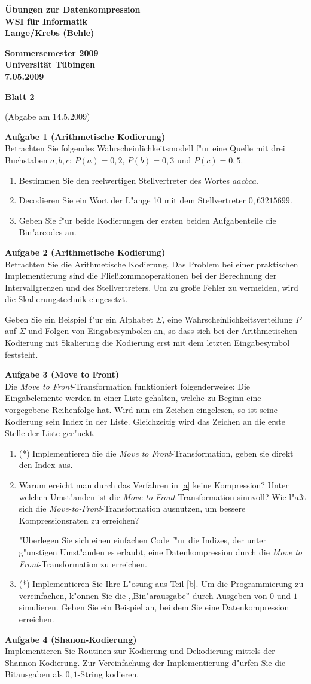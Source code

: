 \documentclass[a4paper]{article}
\def\header#1#2#3#4{\pagestyle{empty}
\noindent
\begin{minipage}[t]{0.6\textwidth}
\begin{flushleft}
\bf \"Ubungen zur Datenkompression\\
WSI f\"ur Informatik\\
Lange/Krebs (Behle)
\end{flushleft}
\end{minipage}
\begin{minipage}[t]{0.4\textwidth}
\begin{flushright}
\bf Sommersemester 2009\\
Universit\"at T\"ubingen\\
#2 %
\end{flushright}
\end{minipage}

\begin{center}
{\Large\bf Blatt #1}

{(Abgabe am #3)}
\end{center}
}
\begin{document}
\header{2}{7.05.2009}{14.5.2009}{}


{\bf Aufgabe 1  \quad(Arithmetische Kodierung)}\smallskip\\
Betrachten Sie folgendes Wahrscheinlichkeitsmodell f"ur eine Quelle mit drei Buchstaben $a,b,c$: $P(a)=0,2$, $P(b)=0,3$ und $P(c)=0,5$.
\begin{enumerate}
\item Bestimmen Sie den reelwertigen Stellvertreter des Wortes $aacbca$.
\item Decodieren Sie ein Wort der L"ange 10 mit dem Stellvertreter $0,63215699$.
\item Geben Sie f"ur beide Kodierungen der ersten beiden Aufgabenteile die Bin"arcodes an.
\end{enumerate}


\bigskip


{\bf Aufgabe 2  \quad(Arithmetische Kodierung)}\smallskip\\
Betrachten Sie die Arithmetische Kodierung. Das Problem bei einer praktischen Implementierung sind die Flie{\ss}kommaoperationen bei der Berechnung der Intervallgrenzen und des Stellvertreters. Um zu gro{\ss}e Fehler zu vermeiden, wird die Skalierungstechnik eingesetzt.

Geben Sie ein Beispiel f"ur ein Alphabet $\Sigma$, eine Wahrscheinlichkeitsverteilung $P$ auf $\Sigma$ und Folgen von Eingabesymbolen an, so dass sich bei der Arithmetischen Kodierung mit Skalierung die Kodierung erst mit dem letzten Eingabesymbol feststeht.

\bigskip

{\bf Aufgabe 3  \quad(Move to Front)}\smallskip\\
Die {\em Move to Front}-Transformation funktioniert folgenderweise: Die Eingabelemente werden in einer Liste gehalten, welche zu Beginn eine vorgegebene Reihenfolge hat. Wird nun ein Zeichen eingelesen, so ist seine Kodierung sein Index in der Liste. Gleichzeitig wird das Zeichen an die erste Stelle der Liste ger"uckt.

\begin{enumerate}
\item\label{a}(*) Implementieren Sie die {\em Move to Front}-Transformation, geben sie direkt den Index aus.
\item\label{b} Warum ereicht man durch das Verfahren in \ref{a} keine Kompression? Unter welchen Umst"anden ist die {\em Move to Front}-Transformation sinnvoll? Wie l"a{\ss}t sich die {\em Move-to-Front}-Transformation ausnutzen, um bessere Kompressionsraten zu erreichen?

"Uberlegen Sie sich einen einfachen Code f"ur die Indizes, der unter g"unstigen Umst"anden es erlaubt, eine Datenkompression durch die {\em Move to Front}-Transformation zu erreichen.
\item(*) Implementieren Sie Ihre L"osung aus Teil \ref{b}. Um die Programmierung zu vereinfachen, k"onnen Sie die ,,Bin"arausgabe'' durch Ausgeben von $0$ und $1$ simulieren. Geben Sie ein Beispiel an, bei dem Sie eine Datenkompression erreichen. 
\end{enumerate}




\bigskip

{\bf Aufgabe 4  \quad(Shanon-Kodierung)}\smallskip\\
Implementieren Sie Routinen zur Kodierung und Dekodierung mittels der Shannon-Kodierung. Zur Vereinfachung der Implementierung d"urfen Sie die Bitausgaben als $0,1$-String kodieren.
\end{document}
